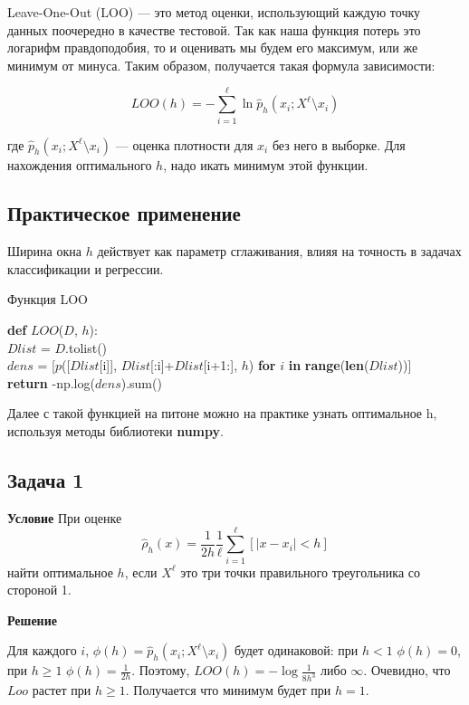Leave-One-Out (LOO) — это метод оценки, использующий каждую точку данных поочередно в качестве тестовой. Так как наша функция потерь это логарифм правдоподобия, то и оценивать мы будем его максимум, или же минимум от минуса. Таким образом, получается такая формула зависимости:

\[
LOO(h) = -\sum_{i=1}^{\ell} \ln \hat{p}_h(x_i; X^\ell \setminus x_i)
\]

где $\hat{p}_h(x_i; X^\ell \setminus x_i)$ — оценка плотности для $x_i$ без него в выборке. Для нахождения оптимального $h$, надо икать минимум этой функции.

\subsection*{Практическое применение}

Ширина окна $h$ действует как параметр сглаживания, влияя на точность в задачах классификации и регрессии.

\begin{algorithm}[H]
\caption{Функция LOO}
\label{alg:LOO}
\textbf{def} $LOO$($D$, $h$):\\

\hspace{1cm} $Dlist$ = $D$.tolist()\\

\hspace{1cm} $dens$ = [$p$([$Dlist$[i]], $Dlist$[:i]+$Dlist$[i+1:], $h$) \textbf{for} $i$ \textbf{in} \textbf{range}(\textbf{len}($Dlist$))]\\

\hspace{1cm} \textbf{return} -np.log($dens$).sum() \\

\end{algorithm}

Далее с такой функцией на питоне можно на практике узнать оптимальное h, используя методы библиотеки \textbf{numpy}.

\subsection*{Задача 1}
\textbf{Условие} 
При оценке
\[
\hat{\rho}_h(x) = \frac{1}{2h} \frac{1}{\ell} \sum_{i=1}^{\ell} \left[ |x - x_i| < h \right]
\]
найти оптимальное $h$, если $X^\ell$ это три точки правильного треугольника со стороной 1.

\textbf{Решение} 

Для каждого $i$, $\phi(h) = \hat{p}_h(x_i; X^\ell \setminus x_i)$ будет одинаковой: при $h < 1$ $\phi(h) = 0$, при $h \geq 1$ $\phi(h) = \frac{1}{2h}$. Поэтому, $LOO(h) = -\log{\frac{1}{8h^3}}$ либо $\infty$. Очевидно, что $Loo$ растет при $h \geq 1$. Получается что минимум будет при $h = 1$.

